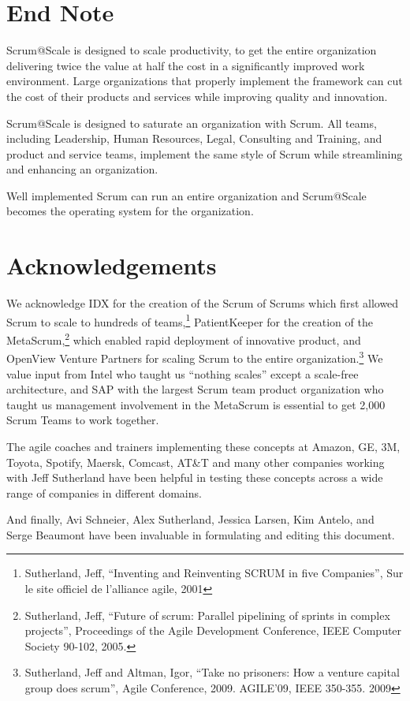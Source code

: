 \documentclass[12pt,a4paper,parskip=full]{scrartcl}
\begin{document}
\section{End Note}

Scrum@Scale is designed to scale productivity, to get the entire organization delivering twice the value at half the cost in a significantly improved work environment. Large organizations that properly implement the framework can cut the cost of their products and services while improving quality and innovation.

Scrum@Scale is designed to saturate an organization with Scrum. All teams, including Leadership, Human Resources, Legal, Consulting and Training, and product and service teams, implement the same style of Scrum while streamlining and enhancing an organization.

Well implemented Scrum can run an entire organization and Scrum@Scale becomes the operating system for the organization.

\section{Acknowledgements}

We acknowledge IDX for the creation of the Scrum of Scrums which first allowed Scrum to scale to hundreds of teams,\footnote{Sutherland, Jeff, ``Inventing and Reinventing SCRUM in five Companies'', Sur le site officiel de l'alliance agile, 2001} PatientKeeper for the creation of the MetaScrum,\footnote{Sutherland, Jeff, ``Future of scrum: Parallel pipelining of sprints in complex projects'', Proceedings of the Agile Development Conference,  IEEE Computer Society 90-102,  2005.} which enabled rapid deployment of innovative product, and OpenView Venture Partners for scaling Scrum to the entire organization.\footnote{Sutherland, Jeff and Altman, Igor, ``Take no prisoners: How a venture capital group does scrum'', Agile Conference, 2009. AGILE'09, IEEE 350-355.  2009} We value input from Intel who taught us ``nothing scales'' except a scale-free architecture, and SAP with the largest Scrum team product organization who taught us management involvement in the MetaScrum is essential to get 2,000 Scrum Teams to work together.

The agile coaches and trainers implementing these concepts at Amazon, GE, 3M, Toyota, Spotify, Maersk, Comcast, AT\&T and many other companies working with Jeff Sutherland have been helpful in testing these concepts across a wide range of companies in different domains.

And finally, Avi Schneier, Alex Sutherland, Jessica Larsen, Kim Antelo, and Serge Beaumont have been invaluable in formulating and editing this document.

\pagebreak

\printbibliography
\end{document}
